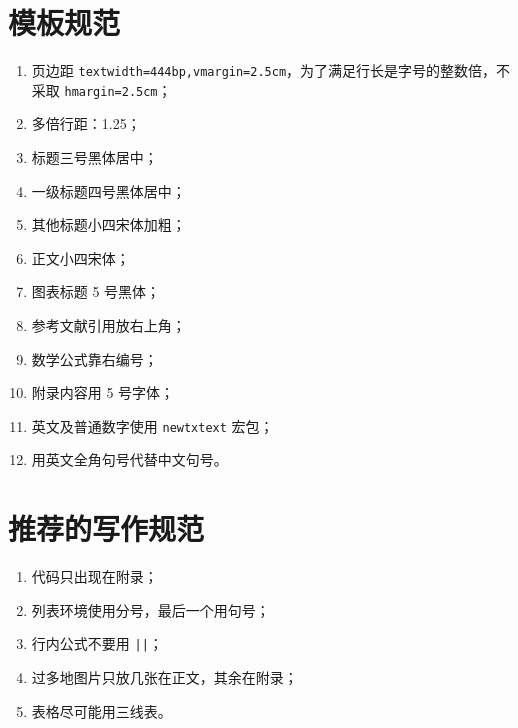 \documentclass{JXUSTmodeling}
\begin{document}
\begin{abstract}
    为了让参加数学建模比赛的人专注内容，而尽可能少去关注格式，特此开发出此模板．以上是套话。
  
    编译环境：
    \begin{itemize}
      \item 发行版：\TeX{} Live 2021；
      \item 编译方式：\texttt{XeLaTeX}；
      \item 编码：UTF8。
    \end{itemize}
  
    使用水平：学习三小时及以上。
  
    本模板只是个说明文档，在写论文时请不要在 \texttt{example.tex} 文件上进行修改，请在 \texttt{main.tex} 上增添内容。
    
    本模板不是官方模板，开发者不对此模板作任何的担保，使用者在使用此模板时出现的任何问题、造成的损失都与开发者无关。
  
    模板代码托管地址：\url{https://github.com/aiyoupass/JXUSTmodeling/}。
  \end{abstract}

\section{模板规范}
\begin{enumerate}
  \item 页边距 \texttt{textwidth=444bp,vmargin=2.5cm}，为了满足行长是字号的整数倍，不采取 \texttt{hmargin=2.5cm}；
  \item 多倍行距：1.25；
  \item 标题三号黑体居中；
  \item 一级标题四号黑体居中；
  \item 其他标题小四宋体加粗；
  \item 正文小四宋体；
  \item 图表标题 5 号黑体；
  \item 参考文献引用放右上角；
  \item 数学公式靠右编号；
  \item 附录内容用 5 号字体；
  \item 英文及普通数字使用 \texttt{newtxtext} 宏包；
  \item 用英文全角句号代替中文句号。
\end{enumerate}

\section{推荐的写作规范}
\begin{enumerate}
  \item 代码只出现在附录；
  \item 列表环境使用分号，最后一个用句号；
  \item 行内公式不要用 \texttt{|\displaystyle|}；
  \item 过多地图片只放几张在正文，其余在附录；
  \item 表格尽可能用三线表。
\end{enumerate}
\end{document}
